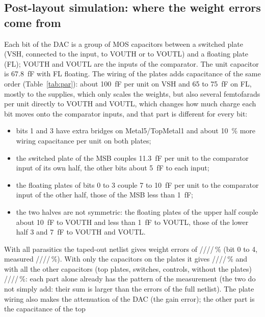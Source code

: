 \ifdefined\PexBitEA
\subsection{Post-layout simulation: where the weight errors come from}
\label{sec:cmp_pex}
Each bit of the DAC is a group of MOS capacitors between a switched plate (VSH, connected to the input,
to VOUTH or to VOUTL) and a floating plate (FL); VOUTH and VOUTL are the inputs of the comparator. The
unit capacitor is \SI{67.8}{fF} with FL floating. The wiring of the plates adds capacitance of the same
order (Table~\ref{tab:par}): about \SI{100}{fF} per unit on VSH and 65 to \SI{75}{fF} on FL, mostly to
the supplies, which only scales the weights, but also several femtofarads per unit directly to VOUTH and
VOUTL, which changes how much charge each bit moves onto the comparator inputs, and that part is
different for every bit:
\begin{itemize}
  \item bits 1 and 3 have extra bridges on Metal5/TopMetal1 and about \SI{10}{\percent} more wiring capacitance per
        unit on both plates;
  \item the switched plate of the MSB couples \SI{11.3}{fF} per unit to the comparator input of its
        own half, the other bits about \SI{5}{fF} to each input;
  \item the floating plates of bits 0 to 3 couple 7 to \SI{10}{fF} per unit to the comparator input of
        the other half, those of the MSB less than \SI{1}{fF};
  \item the two halves are not symmetric: the floating plates of the upper half couple about \SI{10}{fF}
        to VOUTH and less than \SI{1}{fF} to VOUTL, those of the lower half 3 and \SI{7}{fF} to VOUTH and VOUTL.
\end{itemize}
With all parasitics the taped-out netlist gives weight errors of
\PexBitEA/\PexBitEB/\PexBitEC/\PexBitED/\PexBitEE\,\% (bit 0 to 4, measured
\BitEA/\BitEB/\BitEC/\BitED/\BitEE\,\%).
\ifdefined\PexPlBitEA
With only the capacitors on the plates it gives \PexPlBitEA/\PexPlBitEB/\PexPlBitEC/\PexPlBitED/\PexPlBitEE\,\%%
\ifdefined\PexNpBitEA{} and with all the other capacitors (top plates, switches, controls, without the plates)
\PexNpBitEA/\PexNpBitEB/\PexNpBitEC/\PexNpBitED/\PexNpBitEE\,\%\fi: each part alone already has the
pattern of the measurement (the two do not simply add: their sum is larger than the errors of the full
netlist). The plate wiring also
makes the attenuation of the DAC (the gain error); the other part is the capacitance of the top
